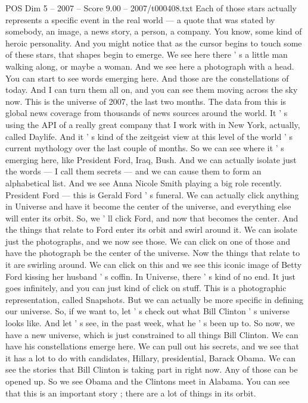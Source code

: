 \begin{textsample}{POS Dim 5 – 2007 – Score 9.00 – 2007/t000408.txt}
Each of those stars actually represents a specific event in the real world — a quote that was stated by somebody, an image, a news story, a person, a company.
You know, some kind of heroic personality.
And you might notice that as the cursor begins to touch some of these stars, that shapes begin to emerge.
We see here there ' s a little man walking along, or maybe a woman.
And we see here a photograph with a head.
You can start to see words emerging here.
And those are the constellations of today.
And I can turn them all on, and you can see them moving across the sky now.
This is the universe of 2007, the last two months.
The data from this is global news coverage from thousands of news sources around the world.
It ' s using the API of a really great company that I work with in New York, actually, called Daylife.
And it ' s kind of the zeitgeist view at this level of the world ' s current mythology over the last couple of months.
So we can see where it ' s emerging here, like President Ford, Iraq, Bush.
And we can actually isolate just the words — I call them secrets — and we can cause them to form an alphabetical list.
And we see Anna Nicole Smith playing a big role recently.
President Ford — this is Gerald Ford ' s funeral.
We can actually click anything in Universe and have it become the center of the universe, and everything else will enter its orbit.
So, we ' ll click Ford, and now that becomes the center.
And the things that relate to Ford enter its orbit and swirl around it.
We can isolate just the photographs, and we now see those.
We can click on one of those and have the photograph be the center of the universe.
Now the things that relate to it are swirling around.
We can click on this and we see this iconic image of Betty Ford kissing her husband ' s coffin.
In Universe, there ' s kind of no end.
It just goes infinitely, and you can just kind of click on stuff.
This is a photographic representation, called Snapshots.
But we can actually be more specific in defining our universe.
So, if we want to, let ' s check out what Bill Clinton ' s universe looks like.
And let ' s see, in the past week, what he ' s been up to.
So now, we have a new universe, which is just constrained to all things Bill Clinton.
We can have his constellations emerge here.
We can pull out his secrets, and we see that it has a lot to do with candidates, Hillary, presidential, Barack Obama.
We can see the stories that Bill Clinton is taking part in right now.
Any of those can be opened up.
So we see Obama and the Clintons meet in Alabama.
You can see that this is an important story ; there are a lot of things in its orbit.

\end{textsample}
